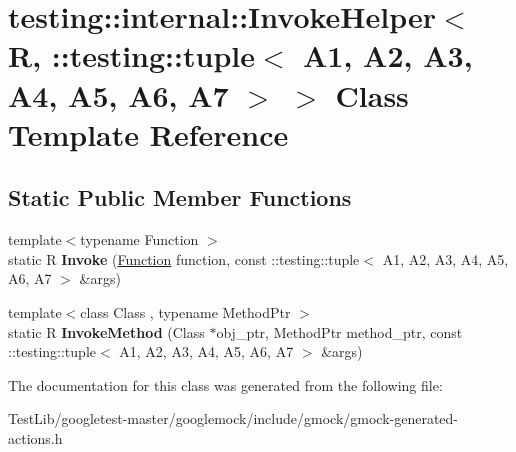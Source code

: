 \hypertarget{classtesting_1_1internal_1_1InvokeHelper_3_01R_00_01_1_1testing_1_1tuple_3_01A1_00_01A2_00_01A3_39d55f6ea73f4d04a19cf9b6bab3a605}{}\section{testing\+:\+:internal\+:\+:Invoke\+Helper$<$ R, \+:\+:testing\+:\+:tuple$<$ A1, A2, A3, A4, A5, A6, A7 $>$ $>$ Class Template Reference}
\label{classtesting_1_1internal_1_1InvokeHelper_3_01R_00_01_1_1testing_1_1tuple_3_01A1_00_01A2_00_01A3_39d55f6ea73f4d04a19cf9b6bab3a605}
\subsection*{Static Public Member Functions}
\begin{DoxyCompactItemize}
\item 
\mbox{\label{classtesting_1_1internal_1_1InvokeHelper_3_01R_00_01_1_1testing_1_1tuple_3_01A1_00_01A2_00_01A3_39d55f6ea73f4d04a19cf9b6bab3a605_a8e2485901be5363b29d29198813374b9}} 
{\footnotesize template$<$typename Function $>$ }\\static R {\bfseries Invoke} (\hyperlink{structtesting_1_1internal_1_1Function}{Function} function, const \+::testing\+::tuple$<$ A1, A2, A3, A4, A5, A6, A7 $>$ \&args)
\item 
\mbox{\label{classtesting_1_1internal_1_1InvokeHelper_3_01R_00_01_1_1testing_1_1tuple_3_01A1_00_01A2_00_01A3_39d55f6ea73f4d04a19cf9b6bab3a605_acd27c62b37fa4f9284dccd8827ddd7af}} 
{\footnotesize template$<$class Class , typename Method\+Ptr $>$ }\\static R {\bfseries Invoke\+Method} (Class $\ast$obj\+\_\+ptr, Method\+Ptr method\+\_\+ptr, const \+::testing\+::tuple$<$ A1, A2, A3, A4, A5, A6, A7 $>$ \&args)
\end{DoxyCompactItemize}


The documentation for this class was generated from the following file\+:\begin{DoxyCompactItemize}
\item 
Test\+Lib/googletest-\/master/googlemock/include/gmock/gmock-\/generated-\/actions.\+h\end{DoxyCompactItemize}
